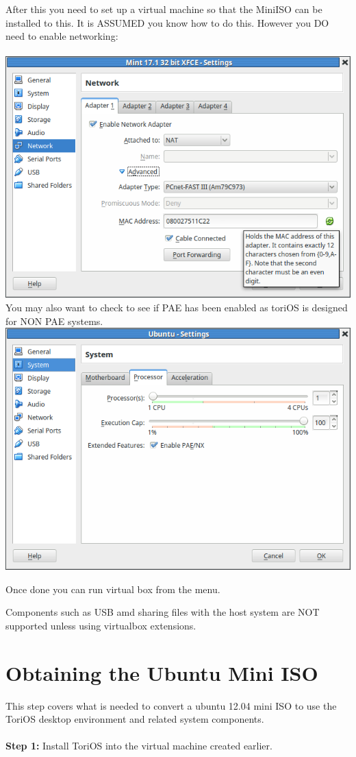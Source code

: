 \documentclass[12pt,a4paper]{book}
\begin{document}
After this you need to set up a virtual machine so that the MiniISO can be installed to this.   It is ASSUMED you know how to do this.  However you DO need to enable networking:\\ \\
\includegraphics[width=0.7\linewidth]{screen-shots/virtualbox-network} \\

You may also want to check to see if PAE has been enabled as toriOS is designed for NON PAE systems.\\
\includegraphics[width=0.7\linewidth]{screen-shots/Virtualbox-enablePAE}


Once done you can run virtual box from the menu.

Components such as USB amd sharing files with the host system are NOT supported unless using virtualbox extensions.  \\



\chapter{Obtaining the Ubuntu Mini ISO}

This step covers what is needed to convert a ubuntu 12.04 mini ISO to use the ToriOS desktop environment and related system components.\\ \\
\textbf{
Step 1:} Install ToriOS into the virtual machine created earlier. 
\end{document}
